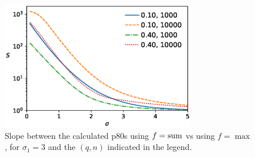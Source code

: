 \documentclass[reprint,aps,pre,amsmath,amssymb,superscriptaddress,showpacs]{revtex4-1}
\begin{document}
\begin{figure}[t]
\includegraphics[width=3.3in]{maxsum.scheduling.dupsplit.arc_distribution_lognormal.arc_sigma_3.eps}
\caption{Slope between the calculated p80s using $f={\rm sum}$ vs using $f={\max}$, for $\sigma_1=3$ and the $(q,n)$ indicated in the legend. }
\label{fig3}
\end{figure}
\end{document}
